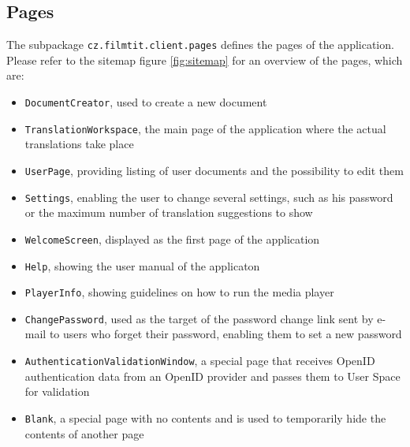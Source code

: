 \subsection{Pages}

The subpackage {\tt cz.filmtit.client.pages} defines the pages of the application.
Please refer to the sitemap figure \ref{fig:sitemap} for an overview of the pages, which are:

\begin{itemize}
\item {\tt DocumentCreator}, used to create a new document
\item {\tt TranslationWorkspace}, the main page of the application where the actual translations take place
\item {\tt UserPage}, providing listing of user documents and the possibility to edit them
\item {\tt Settings}, enabling the user to change several settings, such as his password or the maximum number of translation suggestions to show
\item {\tt WelcomeScreen}, displayed as the first page of the application
\item {\tt Help}, showing the user manual of the applicaton
\item {\tt PlayerInfo}, showing guidelines on how to run the media player
\item {\tt ChangePassword}, used as the target of the password change link sent by e-mail to users who forget their password, enabling them to set a new password
\item {\tt AuthenticationValidationWindow}, a special page that receives OpenID authentication data from an OpenID provider and passes them to User Space for validation
\item {\tt Blank}, a special page with no contents and is used to temporarily hide the contents of another page
\end{itemize}

